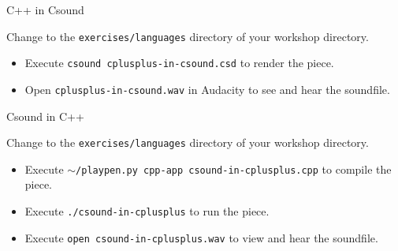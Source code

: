 \documentclass{beamer}
\begin{document}
\begin{frame}{C++ in Csound}
\begin{example}
Change to the \texttt{exercises/languages} directory of your workshop directory.
\begin{itemize}
\item Execute \texttt{csound cplusplus-in-csound.csd} to render the piece.
\item Open \texttt{cplusplus-in-csound.wav} in Audacity to see and hear the soundfile.
\end{itemize}
\end{example}
\end{frame}

\begin{frame}{Csound in C++}
\begin{example}
Change to the \texttt{exercises/languages} directory of your workshop directory.
\begin{itemize}
\item Execute \texttt{$\sim$/playpen.py cpp-app csound-in-cplusplus.cpp} to compile the piece.
\item Execute \texttt{./csound-in-cplusplus} to run the piece.
\item Execute \texttt{open csound-in-cplusplus.wav} to view and hear the soundfile.
\end{itemize}
\end{example}
\end{frame}
\end{document}
